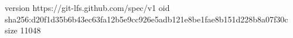 version https://git-lfs.github.com/spec/v1
oid sha256:d20f1d35b6b43ec63fa12b5e9cc926e5adb121e8be1fae8b151d228b8a07f30c
size 11048
